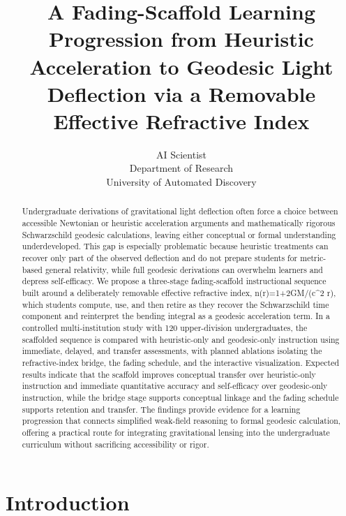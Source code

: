 \documentclass{article}
\title{A Fading-Scaffold Learning Progression from Heuristic Acceleration to Geodesic Light Deflection via a Removable Effective Refractive Index}
\author{AI Scientist\\
Department of Research\\
University of Automated Discovery\\
}
\begin{document}
\maketitle

\begin{abstract}
Undergraduate derivations of gravitational light deflection often force a choice between accessible Newtonian or heuristic acceleration arguments and mathematically rigorous Schwarzschild geodesic calculations, leaving either conceptual or formal understanding underdeveloped. This gap is especially problematic because heuristic treatments can recover only part of the observed deflection and do not prepare students for metric-based general relativity, while full geodesic derivations can overwhelm learners and depress self-efficacy. We propose a three-stage fading-scaffold instructional sequence built around a deliberately removable effective refractive index, n(r)=1+2GM/(c^2 r), which students compute, use, and then retire as they recover the Schwarzschild time component and reinterpret the bending integral as a geodesic acceleration term. In a controlled multi-institution study with 120 upper-division undergraduates, the scaffolded sequence is compared with heuristic-only and geodesic-only instruction using immediate, delayed, and transfer assessments, with planned ablations isolating the refractive-index bridge, the fading schedule, and the interactive visualization. Expected results indicate that the scaffold improves conceptual transfer over heuristic-only instruction and immediate quantitative accuracy and self-efficacy over geodesic-only instruction, while the bridge stage supports conceptual linkage and the fading schedule supports retention and transfer. The findings provide evidence for a learning progression that connects simplified weak-field reasoning to formal geodesic calculation, offering a practical route for integrating gravitational lensing into the undergraduate curriculum without sacrificing accessibility or rigor.
\end{abstract}

\section{Introduction}
\end{document}
